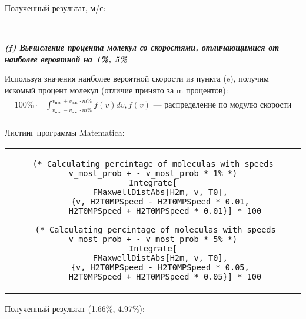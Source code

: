 Полученный результат, м/с:
\hspace{0pt}
\begin{figure}[H]
    \centering
    \begin{minipage}[h]{0.2\linewidth}
        \\
    \end{minipage}
\end{figure}



\textit{\textbf{(f) Вычисление процента молекул со скоростями, отличающимися от наиболее вероятной на 1\%, 5\%}}  

Используя значения наиболее вероятной скорости из пункта (e), получим искомый процент молекул (отличие принято за m процентов):
\begin{equation*}
    \begin{aligned}
        100\% \cdot 
        &\int_{ v_{\text{н.в.}} - v_{\text{н.в.}} \cdot m\% }^{
        v_{\text{н.в.}} + v_{\text{н.в.}} \cdot m\% } f(v)dv, 
        f(v) \text{ --- распределение по модулю скорости}\\
    \end{aligned}
\end{equation*}


Листинг программы Matematica:
\begin{center}
    \begin{tabular}{c}
    \begin{lstlisting}
(* Calculating percintage of moleculas with speeds v_most_prob + - v_most_prob * 1% *)
Integrate[
    FMaxwellDistAbs[H2m, v, T0], 
    {v, H2T0MPSpeed - H2T0MPSpeed * 0.01, 
     H2T0MPSpeed + H2T0MPSpeed * 0.01}] * 100

 (* Calculating percintage of moleculas with speeds v_most_prob + - v_most_prob * 5% *)
Integrate[
    FMaxwellDistAbs[H2m, v, T0], 
    {v, H2T0MPSpeed - H2T0MPSpeed * 0.05, 
     H2T0MPSpeed + H2T0MPSpeed * 0.05}] * 100
    \end{lstlisting}
    \end{tabular}
\end{center}

Полученный результат (1.66\%, 4.97\%):
\hspace{0pt}
\begin{figure}[H]
    \centering
    \begin{minipage}[h]{1\linewidth}
        \\
    \end{minipage}
\end{figure}

